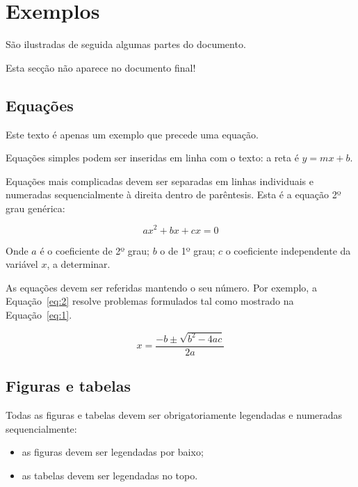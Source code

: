 \section*{Exemplos}


\begin{info}
  São ilustradas de seguida algumas partes do documento.
  
  Esta secção não aparece no documento final!
\end{info}

\subsection*{Equações}

\begin{info}
Este texto é apenas um exemplo que precede uma equação.
\end{info}  

Equações simples podem ser inseridas em linha com o texto: 
a reta é \(y=mx+b\).

Equações mais complicadas devem ser separadas em linhas individuais e
numeradas sequencialmente à direita dentro de parêntesis.
Esta é a equação 2º grau genérica:

\begin{equation} \label{eq:1}
  ax^2+bx+cx=0
\end{equation}

Onde $a$ é o coeficiente de 2º grau; $b$ o de 1º grau; $c$ o
coeficiente independente da variável $x$, a determinar.

As equações devem ser referidas mantendo o seu número.
Por exemplo, a Equação~\ref{eq:2} resolve problemas formulados tal como 
mostrado na Equação~\ref{eq:1}.

\begin{equation} \label{eq:2}
  x=\frac{-b\pm \sqrt{b^2-4ac}}{2a}
\end{equation}

\lipsum[1]

\subsection*{Figuras e tabelas}

Todas as figuras e tabelas devem ser obrigatoriamente legendadas e
numeradas sequencialmente:

\begin{itemize}
\item as figuras devem ser legendadas por baixo;
\item as tabelas devem ser legendadas no topo. 
\end{itemize}

